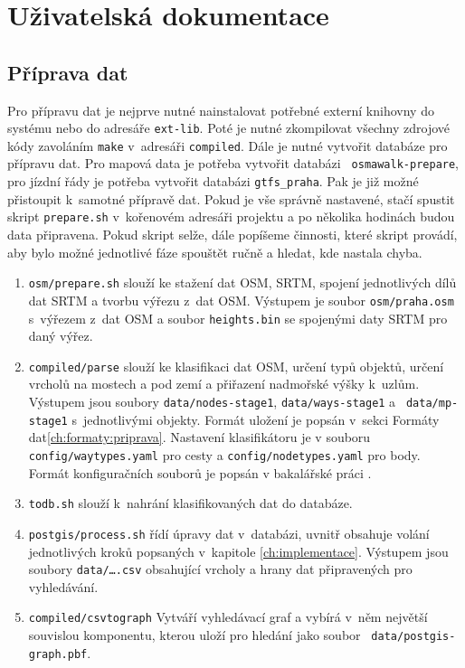 \chapter{Uživatelská dokumentace}
\section{Příprava dat}
Pro přípravu dat je nejprve nutné nainstalovat potřebné externí knihovny do
systému nebo do adresáře {\tt ext-lib}. Poté je nutné zkompilovat všechny zdrojové
kódy zavoláním {\tt make} v~adresáři {\tt compiled}. Dále je nutné vytvořit databáze
pro přípravu dat. Pro mapová data je potřeba vytvořit databázi {\tt
osmawalk-prepare},
pro jízdní řády je potřeba vytvořit databázi {\tt gtfs\_praha}. Pak je již možné
přistoupit k~samotné přípravě dat. Pokud je vše správně nastavené, stačí spustit
skript {\tt prepare.sh} v~kořenovém adresáři projektu a po několika hodinách
budou data připravena. Pokud skript selže, dále popíšeme činnosti, které skript
provádí, aby bylo možné jednotlivé fáze spouštět ručně a hledat, kde nastala chyba.

\begin{enumerate}
\item {\tt osm/prepare.sh} slouží ke stažení dat OSM, SRTM, spojení jednotlivých
dílů dat SRTM a tvorbu výřezu z~dat OSM. Výstupem je soubor {\tt osm/praha.osm}
s~výřezem z~dat OSM a soubor {\tt heights.bin} se spojenými daty SRTM pro daný
výřez. 
\item {\tt compiled/parse} slouží ke klasifikaci dat OSM, určení typů objektů,
určení vrcholů na mostech a pod zemí a přiřazení nadmořské výšky k~uzlům.
Výstupem jsou soubory {\tt data/nodes-stage1}, {\tt data/ways-stage1} a {\tt
data/mp-stage1} s~jednotlivými objekty. Formát uložení je popsán v~sekci Formáty
dat\ref{ch:formaty:priprava}. Nastavení klasifikátoru je v souboru {\tt
config/waytypes.yaml} pro cesty a {\tt config/nodetypes.yaml} pro body. Formát
konfiguračních souborů je popsán v bakalářské práci \cite{bakalarka}.
\item {\tt todb.sh} slouží k~nahrání klasifikovaných dat do databáze. 
\item {\tt postgis/process.sh} řídí úpravy dat v~databázi, uvnitř obsahuje
volání jednotlivých kroků popsaných v~kapitole \ref{ch:implementace}.
Výstupem jsou soubory {\tt data/\dots.csv} obsahující vrcholy a hrany dat
připravených pro vyhledávání. 
\item {\tt compiled/csvtograph} Vytváří vyhledávací graf a vybírá v~něm největší
souvislou komponentu, kterou uloží pro hledání jako soubor {\tt
data/postgis-graph.pbf}.
\end{enumerate}

